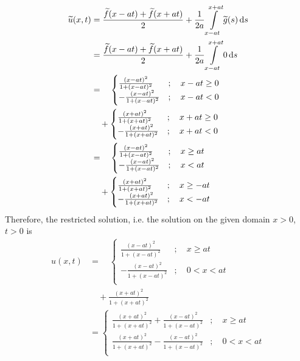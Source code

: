 \documentclass[fleqn, a4paper, 11pt, oneside]{amsart}
\theoremstyle{definition}
\theoremstyle{theorem}
\renewcommand{\tilde}{\widetilde}
\begin{document}
\begin{solution}
\begin{align*}
		\tilde{u}(x,t) & = \frac{\tilde{f}(x - a t) + \tilde{f}(x + a t)}{2} + \frac{1}{2 a} \int\limits_{x - a t}^{x + a t} \tilde{g}(s) \dif s\\
		&= \frac{\tilde{f}(x - a t) + \tilde{f}(x + a t)}{2} + \frac{1}{2 a} \int\limits_{x - a t}^{x + a t} 0 \dif s\\
		&=\quad
			\begin{cases}
				\frac{(x - a t)^2}{1 + (x - a t)^2}  & ;\quad x - a t \ge 0 \\
				-\frac{(x - a t)^2}{1 + (x - a t)^2} & ;\quad x - a t < 0   \\
			\end{cases}\\
		&\quad +
			\begin{cases}
				\frac{(x + a t)^2}{1 + (x + a t)^2}  & ;\quad x + a t \ge 0 \\
				-\frac{(x + a t)^2}{1 + (x + a t)^2} & ;\quad x + a t < 0   \\
			\end{cases}\\
		&=\quad
			\begin{cases}
				\frac{(x - a t)^2}{1 + (x - a t)^2}  & ;\quad x \ge a t \\
				-\frac{(x - a t)^2}{1 + (x - a t)^2} & ;\quad x < a t   \\
			\end{cases}\\
		&\quad +
			\begin{cases}
				\frac{(x + a t)^2}{1 + (x + a t)^2}  & ;\quad x \ge -a t \\
				-\frac{(x + a t)^2}{1 + (x + a t)^2} & ;\quad x < -a t   \\
			\end{cases}
	\end{align*}
	Therefore, the restricted solution, i.e. the solution on the given domain $x > 0$, $t > 0$ is
	\begin{align*}
		u(x,t) &=\quad
			\begin{cases}
				\frac{(x - a t)^2}{1 + (x - a t)^2}  & ;\quad x \ge a t   \\
				-\frac{(x - a t)^2}{1 + (x - a t)^2} & ;\quad 0 < x < a t \\
			\end{cases}\\
		&\quad + \frac{(x + a t)^2}{1 + (x + a t)^2}\\
		&=
			\begin{cases}
				\frac{(x + a t)^2}{1 + (x + a t)^2} + \frac{(x - a t)^2}{1 + (x - a t)^2} & ;\quad x \ge a t   \\
				\frac{(x + a t)^2}{1 + (x + a t)^2} - \frac{(x - a t)^2}{1 + (x - a t)^2} & ;\quad 0 < x < a t \\
			\end{cases}\\
	\end{align*}
\end{solution}
\end{document}
